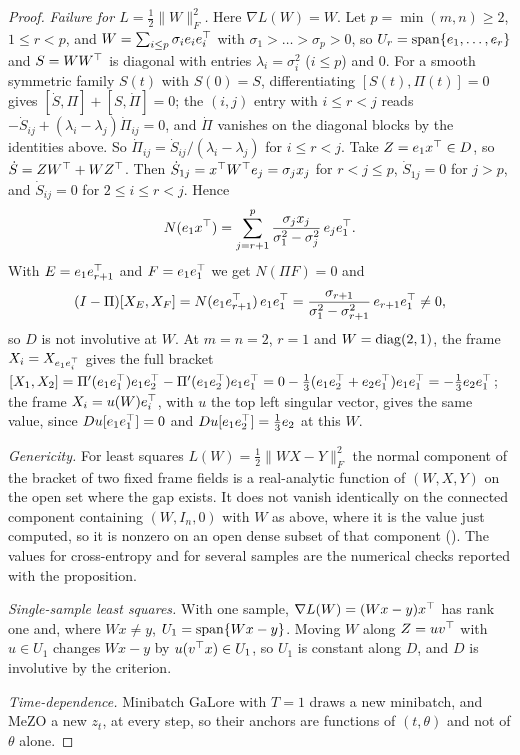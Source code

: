 \begin{proof}
\emph{Failure for $L=\tfrac12\lVert W\rVert_F^2$.} Here $\nabla L(W)=W$. Let $p=\min(m,n)\ge2$, $1\le r<p$, and
$W=\sum_{i\le p}\sigma_ie_ie_i^{\top}$ with $\sigma_1>\dots>\sigma_p>0$, so $U_r=\operatorname{span}\{e_1,\dots,e_r\}$ and $S=WW^{\top}$ is
diagonal with entries $\lambda_i=\sigma_i^2$ ($i\le p$) and $0$. For a smooth symmetric family $S(t)$ with $S(0)=S$,
differentiating $[S(t),\Pi(t)]=0$ gives $[\dot S,\Pi]+[S,\dot\Pi]=0$; the $(i,j)$ entry with $i\le r<j$ reads
$-\dot S_{ij}+(\lambda_i-\lambda_j)\dot\Pi_{ij}=0$, and $\dot\Pi$ vanishes on the diagonal blocks by the identities above.
So $\dot\Pi_{ij}=\dot S_{ij}/(\lambda_i-\lambda_j)$ for $i\le r<j$. Take $Z=e_1x^{\top}\in D$, so $\dot S=ZW^{\top}+WZ^{\top}$. Then
$\dot S_{1j}=x^{\top} W^{\top} e_j=\sigma_jx_j$ for $r<j\le p$, $\dot S_{1j}=0$ for $j>p$, and $\dot S_{ij}=0$ for $2\le i\le r<j$. Hence
\[N(e_1x^{\top})=\sum_{j=r+1}^{p}\frac{\sigma_jx_j}{\sigma_1^2-\sigma_j^2}\,e_je_1^{\top} .\]
With $E=e_1e_{r+1}^{\top}$ and $F=e_1e_1^{\top}$ we get $N(\Pi F)=0$ and
\[(I-\Pi)[X_E,X_F]=N(e_1e_{r+1}^{\top})\,e_1e_1^{\top}=\frac{\sigma_{r+1}}{\sigma_1^2-\sigma_{r+1}^2}\,e_{r+1}e_1^{\top}\ne0 ,\]
so $D$ is not involutive at $W$. At $m=n=2$, $r=1$ and $W=\operatorname{diag}(2,1)$, the frame $X_i=X_{e_1e_i^{\top}}$ gives the full bracket
$[X_1,X_2]=\Pi'(e_1e_1^{\top})e_1e_2^{\top}-\Pi'(e_1e_2^{\top})e_1e_1^{\top}=0-\tfrac13(e_1e_2^{\top}+e_2e_1^{\top})e_1e_1^{\top}=-\tfrac13e_2e_1^{\top}$; the frame
$X_i=u(W)e_i^{\top}$, with $u$ the top left singular vector, gives the same value, since $Du[e_1e_1^{\top}]=0$ and
$Du[e_1e_2^{\top}]=\tfrac13e_2$ at this $W$.

\emph{Genericity.} For least squares $L(W)=\tfrac12\lVert WX-Y\rVert_F^2$ the normal component of the bracket of two fixed
frame fields is a real-analytic function of $(W,X,Y)$ on the open set where the gap exists. It does not vanish identically
on the connected component containing $(W,I_n,0)$ with $W$ as above, where it is the value just computed, so it is nonzero
on an open dense subset of that component (). The values for cross-entropy and for several samples are the
numerical checks reported with the proposition.

\emph{Single-sample least squares.} With one sample, $\nabla L(W)=(Wx-y)x^{\top}$ has rank one and, where $Wx\ne y$,
$U_1=\operatorname{span}\{Wx-y\}$. Moving $W$ along $Z=uv^{\top}$ with $u\in U_1$ changes $Wx-y$ by $u(v^{\top} x)\in U_1$, so $U_1$ is constant
along $D$, and $D$ is involutive by the criterion.

\emph{Time-dependence.} Minibatch GaLore with $T=1$ draws a new minibatch, and MeZO a new $z_t$, at every step, so their
anchors are functions of $(t,\theta)$ and not of $\theta$ alone.
\end{proof}

